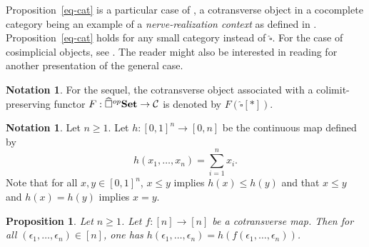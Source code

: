 \documentclass[a4paper,12pt]{amsart}
\newcommand{\C}{\mathcal{C}}
\newtheorem{prop}[thm]{Proposition}
\newcommand{\bp}{\begin{prop}}
\newcommand{\ep}{\end{prop}}
\theoremstyle{definition}
\newtheorem{nota}[thm]{Notation}
\renewcommand{\leq}{\leqslant}
\renewcommand{\geq}{\geqslant}
\newcommand{\brm}[1]{{\rm{\mathbf{#1}}}}
\newcommand{\set}{{\brm{Set}}}
\begin{document}
Proposition~\ref{eq-cat} is a particular case of \cite[Remark~3.2.3]{coend-calculus}, a cotransverse object in a cocomplete category being an example of a \textit{nerve-realization context} as defined in \cite[Definition~3.2.1]{coend-calculus}. Proposition~\ref{eq-cat} holds for any small category instead of $\widehat{\square}$. For the case of cosimplicial objects, see \cite[Proposition~3.1.5]{MR99h:55031}. The reader might also be interested in reading \cite[Remark~6.5.9]{CategoryInContext} for another presentation of the general case.

\begin{nota}
	For the sequel, the cotransverse object associated with a colimit-preserving functor $F:\widehat{\square}^{op}\set\to \C$ is denoted by $F(\widehat{\square}[*])$. 
\end{nota}

\begin{nota} \label{def_h}
	Let $n\geq 1$. Let $h:[0,1]^n \to [0,n]$ be the continuous map defined by \[h(x_1,\dots,x_n) = \sum_{i=1}^n x_i.\]
	Note that for all $x,y\in [0,1]^n$, $x\leq y$ implies $h(x)\leq h(y)$ and that $x\leq y$ and $h(x)=h(y)$ implies $x=y$.
\end{nota}

\bp \label{preserv-h-dis}
Let $n\geq 1$. Let $f:[n]\to [n]$ be a cotransverse map. Then for all $(\epsilon_1,\dots,\epsilon_n)\in [n]$, one has $h(\epsilon_1,\dots,\epsilon_n) = h(f(\epsilon_1,\dots,\epsilon_n))$.
\ep
\end{document}
